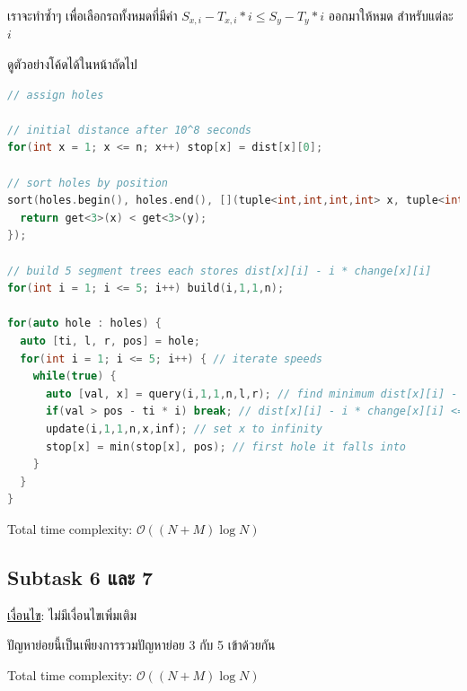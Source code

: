 \documentclass[12pt]{article}
\begin{document}
เราจะทำซ้ำๆ เพื่อเลือกรถทั้งหมดที่มีค่า $S_{x,i} - T_{x,i} * i \leq S_y - T_y * i$ ออกมาให้หมด สำหรับแต่ละ $i$

ดูตัวอย่างโค้ดได้ในหน้าถัดไป

\newpage

\begin{lstlisting}[language=C++]
// assign holes

// initial distance after 10^8 seconds
for(int x = 1; x <= n; x++) stop[x] = dist[x][0];

// sort holes by position
sort(holes.begin(), holes.end(), [](tuple<int,int,int,int> x, tuple<int,int,int,int> y) {
  return get<3>(x) < get<3>(y);
});

// build 5 segment trees each stores dist[x][i] - i * change[x][i]
for(int i = 1; i <= 5; i++) build(i,1,1,n);

for(auto hole : holes) {
  auto [ti, l, r, pos] = hole;
  for(int i = 1; i <= 5; i++) { // iterate speeds
    while(true) {
      auto [val, x] = query(i,1,1,n,l,r); // find minimum dist[x][i] - i * change[x][i]
      if(val > pos - ti * i) break; // dist[x][i] - i * change[x][i] <= pos - ti * i
      update(i,1,1,n,x,inf); // set x to infinity
      stop[x] = min(stop[x], pos); // first hole it falls into
    }
  }
}
\end{lstlisting}

Total time complexity: $\mathcal{O}((N+M)\log N)$

\subsection{Subtask 6 และ 7}

\underline{เงื่อนไข}: ไม่มีเงื่อนไขเพิ่มเติม

ปัญหาย่อยนี้เป็นเพียงการรวมปัญหาย่อย 3 กับ 5 เข้าด้วยกัน

Total time complexity: $\mathcal{O}((N+M)\log N)$

\newpage
\end{document}
